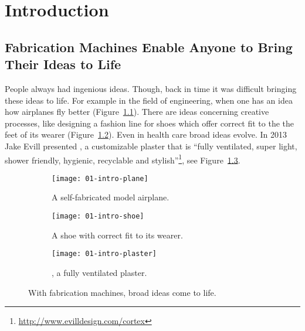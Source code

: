 \documentclass[../ClassicThesis.tex]{subfiles}
\begin{document}
\chapter{Introduction}
\label{ch:introduction}

\section{Fabrication Machines Enable Anyone to Bring Their Ideas to Life}
\label{sec:introduction}


People always had ingenious ideas. Though, back in time it was
difficult bringing these ideas to life. For example in the field of
engineering, when one has an idea how airplanes fly better
(Figure~\ref{fig:intro-ideas:plane}). There are ideas concerning
creative processes, like designing a fashion line for shoes which offer correct
fit to the the feet of its wearer (Figure~\ref{fig:intro-ideas:shoe}).
Even in health care broad ideas evolve. In 2013 Jake Evill presented
, a customizable plaster that is \enquote{fully
  ventilated, super light, shower friendly, hygienic, recyclable and
  stylish}\footnote{\url{http://www.evilldesign.com/cortex}}, see
Figure~\ref{fig:intro-ideas:plaster}. 

\begin{figure}[h]
  \centering
  \begin{subfigure}[b]{0.321\textwidth}
    \centering
    \texttt{[image: 01-intro-plane]}
    \caption{A self-fabricated model airplane.}
    \label{fig:intro-ideas:plane}
  \end{subfigure}
  \begin{subfigure}[b]{0.321\textwidth}
    \centering
    \texttt{[image: 01-intro-shoe]}
    \caption{A shoe with correct fit to its wearer.}
    \label{fig:intro-ideas:shoe}
  \end{subfigure}
  \begin{subfigure}[c]{0.321\textwidth}
    \centering
    \texttt{[image: 01-intro-plaster]}
    \caption{, a fully ventilated plaster.}
    \label{fig:intro-ideas:plaster}
  \end{subfigure}
  \caption{With fabrication machines, broad ideas come to life.}
  \label{fig:intro-ideas}
\end{figure}
\end{document}

